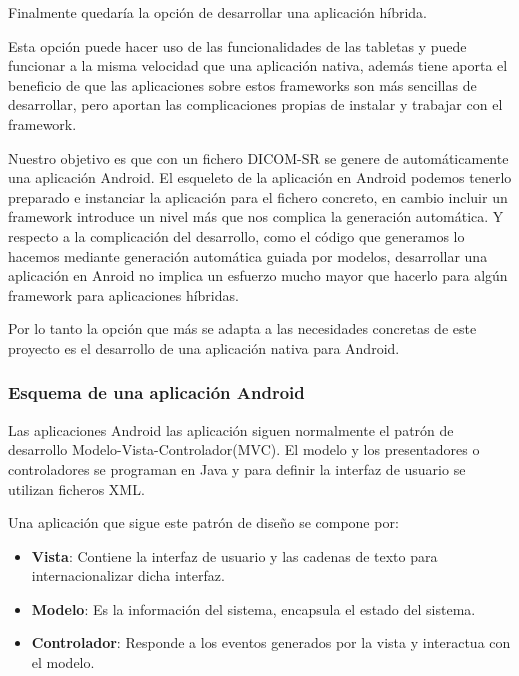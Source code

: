 Finalmente quedaría la opción de desarrollar una aplicación híbrida.\par
Esta opción puede hacer uso de las funcionalidades de las tabletas y puede funcionar a la misma velocidad que una aplicación nativa, además tiene aporta el beneficio de que las aplicaciones sobre estos frameworks son más sencillas de desarrollar, pero aportan las complicaciones propias de instalar y trabajar con el framework.\par
Nuestro objetivo es que con un fichero DICOM-SR se genere de automáticamente una aplicación Android. El esqueleto de la aplicación en Android podemos tenerlo preparado e instanciar la aplicación para el fichero concreto, en cambio incluir un framework introduce un nivel más que nos complica la generación automática. Y respecto a la complicación del desarrollo, como el código que generamos lo hacemos mediante generación automática guiada por modelos, desarrollar una aplicación en Anroid no implica un esfuerzo mucho mayor que hacerlo para algún framework para aplicaciones híbridas.\medskip\par

Por lo tanto la opción que más se adapta a las necesidades concretas de este proyecto es el desarrollo de una aplicación nativa para Android.\par

\subsubsection{Esquema de una aplicación Android}
Las aplicaciones Android las aplicación siguen normalmente el patrón de desarrollo Modelo-Vista-Controlador(MVC).
El modelo y los presentadores o controladores se programan en Java y para definir la interfaz de usuario se utilizan ficheros XML.\par
Una aplicación que sigue este patrón de diseño se compone por:
\begin{itemize}
\item \textbf{Vista}: Contiene la interfaz de usuario y las cadenas de texto para internacionalizar dicha interfaz.\par
\item \textbf{Modelo}: Es la información del sistema, encapsula el estado del sistema. 
\item \textbf{Controlador}: Responde a los eventos generados por la vista y interactua con el modelo. 
\end{itemize}

